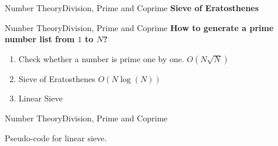 \documentclass[mathserif,10pt]{beamer}
\begin{document}
\begin{frame}{Number Theory}{Division, Prime and Coprime}
\textbf{\large Sieve of Eratosthenes } \\
\begin{center}
\end{center}
\end{frame}


\begin{frame}{Number Theory}{Division, Prime and Coprime}
\textbf{\large How to generate a prime number list from $1$ to $N$?}
\begin{enumerate}
	\item Check whether a number is prime one by one. $O(N\sqrt{N})$
	\item Sieve of Eratosthenes \pause $O(N\log(N))$ \pause
	\item Linear Sieve
\end{enumerate}
\end{frame}


\begin{frame}{Number Theory}{Division, Prime and Coprime}
\begin{algorithm}[H]
\begin{algorithmic}[1]
	\ENDFOR
		\ENDIF
			\ENDIF
		\ENDWHILE
	\ENDFOR
\end{algorithmic}
\caption*{Pseudo-code for linear sieve.}
\end{algorithm}
\end{frame}
\end{document}
